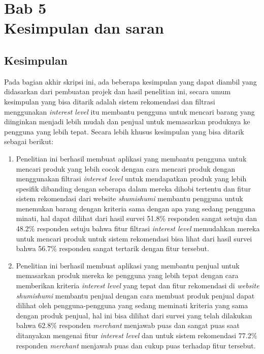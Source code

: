 \documentclass[a4paper]{article}
\newcommand{\bab}[2]{%
    \addtocounter{section}{1}%
    \setcounter{subsection}{0}
    \setcounter{subsubsection}{0}
    \setcounter{figure}{0}
    \setcounter{table}{0}
    \section*{#1\\#2}%
    \addcontentsline{toc}{section}{\protect\numberline{}#1 #2}%
}
\newcommand{\subbab}[1]{%
    \subsection{#1}%
    \setcounter{figure}{0}
    \setcounter{table}{0}
}
\begin{document}
\bab{Bab 5}{Kesimpulan dan saran}
\subbab{Kesimpulan}
Pada bagian akhir skripsi ini, ada beberapa kesimpulan yang dapat diambil yang didasarkan dari pembuatan projek dan hasil penelitian ini, secara umum kesimpulan yang bisa ditarik adalah sistem rekomendasi dan filtrasi menggunakan \textit{interest level} itu membantu pengguna untuk mencari barang yang diinginkan menjadi lebih mudah dan penjual untuk memasarkan produknya ke pengguna yang lebih tepat. Secara lebih khusus kesimpulan yang bisa ditarik sebagai berikut:
\begin{enumerate}
    \item Penelitian ini berhasil membuat aplikasi yang membantu pengguna untuk mencari produk yang lebih cocok dengan cara mencari produk dengan menggunakan filtrasi \textit{interest level} untuk mendapatkan produk yang lebih spesifik dibanding dengan seberapa dalam mereka dihobi tertentu dan fitur sistem rekomendasi dari website \textit{shumishumi} membantu pengguna untuk menemukan barang dengan kriteria sama dengan apa yang sedang pengguna minati, hal dapat dilihat dari hasil  survei 51.8\% responden sangat setuju dan 48.2\% responden setuju bahwa fitur filtrasi \textit{interest level} memudahkan mereka untuk mencari produk untuk sistem rekomendasi bisa lihat dari hasil survei bahwa 56.7\% responden sangat tertarik dengan fitur tersebut.
    \item Penelitian ini berhasil membuat aplikasi yang membantu penjual untuk memasarkan produk mereka ke pengguna yang lebih tepat dengan cara memberikan kriteria \textit{interest level} yang tepat dan fitur rekomendasi di \textit{website shumishumi} membantu penjual dengan cara membuat produk penjual dapat dilihat oleh pengguna-pengguna yang sedang meminati kriteria yang sama dengan produk penjual, hal ini bisa dilihat dari survei yang telah dilakukan bahwa 62.8\% responden \textit{merchant} menjawab puas dan sangat puas saat ditanyakan mengenai fitur \textit{interest level} dan untuk sistem rekomendasi 77.2\% responden \textit{merchant} menjawab puas dan cukup puas terhadap fitur tersebut.
\end{enumerate}
\end{document}
